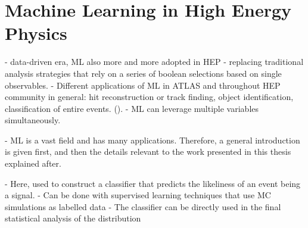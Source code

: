 





\chapter{Machine Learning in High Energy Physics}
\label{chap:ml}


- data-driven era, ML also more and more adopted in HEP
- replacing traditional analysis strategies that rely on a series of boolean selections based on single observables.
- Different applications of ML in ATLAS and throughout HEP community in general: hit reconstruction  or track finding, object identification, classification of entire events. ().
- ML can leverage multiple variables simultaneously.

- ML is a vast field and has many applications. Therefore, a general introduction is given first, and then the details relevant to the work presented in this thesis explained after.

- Here, used to construct a classifier that predicts the likeliness of an event being a signal.
- Can be done with supervised learning techniques that use MC simulations as labelled data
- The classifier can be directly used in the final statistical analysis of the distribution



